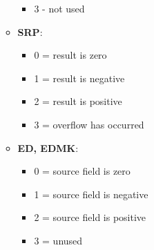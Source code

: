\documentclass{report}
\begin{document}
\begin{itemize}
\begin{itemize}
\begin{itemize}
                        \item 3 - not used
                    \end{itemize}
                \item \textbf{SRP}:
                    \begin{itemize}
                        \item 0 = result is zero
                        \item 1 = result is negative
                        \item 2 = result is positive
                        \item 3 = overflow has occurred
                    \end{itemize}
                \item \textbf{ED, EDMK}:
                    \begin{itemize}
                        \item 0 = source field is zero 
                        \item 1 = source field is negative 
                        \item 2 = source field is positive
                        \item 3 = unused
                    \end{itemize}
            \end{itemize}
    \end{itemize}
\end{document}
